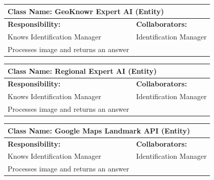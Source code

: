 \documentclass[]{article}
\begin{document}
	\begin{table}[H]
		\centering
		\begin{tabular}{|p{8cm}|p{8cm}|}
		\hline 
		 \multicolumn{2}{|l|}{\textbf{Class Name:} GeoKnowr Expert AI (Entity)} \\
		\hline
		\textbf{Responsibility:} & \textbf{Collaborators:} \\
		\hline
            Knows Identification Manager & Identification Manager \\
            Processes image and returns an answer
		\vspace{1cm} & \\
		\hline
		\end{tabular}
	\end{table}

	\begin{table}[H]
		\centering
		\begin{tabular}{|p{8cm}|p{8cm}|}
		\hline 
		 \multicolumn{2}{|l|}{\textbf{Class Name:} Regional Expert AI (Entity)} \\
		\hline
		\textbf{Responsibility:} & \textbf{Collaborators:} \\
		\hline
            Knows Identification Manager & Identification Manager \\
            Processes image and returns an answer
		\vspace{1cm} & \\
		\hline
		\end{tabular}
	\end{table}

	\begin{table}[H]
		\centering
		\begin{tabular}{|p{8cm}|p{8cm}|}
		\hline 
		 \multicolumn{2}{|l|}{\textbf{Class Name:} Google Maps Landmark API (Entity)} \\
		\hline
		\textbf{Responsibility:} & \textbf{Collaborators:} \\
		\hline
            Knows Identification Manager & Identification Manager \\
            Processes image and returns an answer
		\vspace{1cm} & \\
		\hline
		\end{tabular}
	\end{table}
\end{document}
